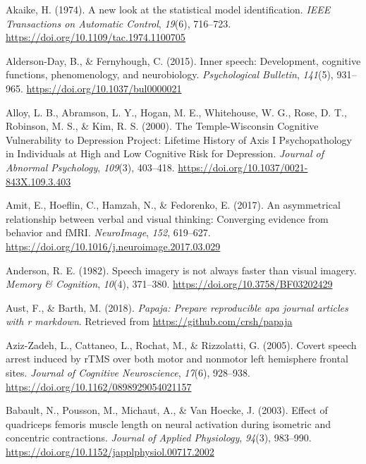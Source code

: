 \documentclass[a4paper,12pt,twoside,openright,oldfontcommands,final]{memoir}
\begin{document}
\leavevmode\hypertarget{ref-akaike_new_1974}{}%
Akaike, H. (1974). A new look at the statistical model identification. \emph{IEEE Transactions on Automatic Control}, \emph{19}(6), 716--723. \url{https://doi.org/10.1109/tac.1974.1100705}

\leavevmode\hypertarget{ref-alderson-day_inner_2015}{}%
Alderson-Day, B., \& Fernyhough, C. (2015). Inner speech: Development, cognitive functions, phenomenology, and neurobiology. \emph{Psychological Bulletin}, \emph{141}(5), 931--965. \url{https://doi.org/10.1037/bul0000021}

\leavevmode\hypertarget{ref-alloy_temple-wisconsin_2000}{}%
Alloy, L. B., Abramson, L. Y., Hogan, M. E., Whitehouse, W. G., Rose, D. T., Robinson, M. S., \& Kim, R. S. (2000). The Temple-Wisconsin Cognitive Vulnerability to Depression Project: Lifetime History of Axis I Psychopathology in Individuals at High and Low Cognitive Risk for Depression. \emph{Journal of Abnormal Psychology}, \emph{109}(3), 403--418. \url{https://doi.org/10.1037/0021-843X.109.3.403}

\leavevmode\hypertarget{ref-amit_asymmetrical_2017}{}%
Amit, E., Hoeflin, C., Hamzah, N., \& Fedorenko, E. (2017). An asymmetrical relationship between verbal and visual thinking: Converging evidence from behavior and fMRI. \emph{NeuroImage}, \emph{152}, 619--627. \url{https://doi.org/10.1016/j.neuroimage.2017.03.029}

\leavevmode\hypertarget{ref-anderson_speech_1982}{}%
Anderson, R. E. (1982). Speech imagery is not always faster than visual imagery. \emph{Memory \& Cognition}, \emph{10}(4), 371--380. \url{https://doi.org/10.3758/BF03202429}

\leavevmode\hypertarget{ref-R-papaja}{}%
Aust, F., \& Barth, M. (2018). \emph{Papaja: Prepare reproducible apa journal articles with r markdown}. Retrieved from \url{https://github.com/crsh/papaja}

\leavevmode\hypertarget{ref-Aziz-Zadeh2005}{}%
Aziz-Zadeh, L., Cattaneo, L., Rochat, M., \& Rizzolatti, G. (2005). Covert speech arrest induced by rTMS over both motor and nonmotor left hemisphere frontal sites. \emph{Journal of Cognitive Neuroscience}, \emph{17}(6), 928--938. \url{https://doi.org/10.1162/0898929054021157}

\leavevmode\hypertarget{ref-babault_effect_2003}{}%
Babault, N., Pousson, M., Michaut, A., \& Van Hoecke, J. (2003). Effect of quadriceps femoris muscle length on neural activation during isometric and concentric contractions. \emph{Journal of Applied Physiology}, \emph{94}(3), 983--990. \url{https://doi.org/10.1152/japplphysiol.00717.2002}
\end{document}
